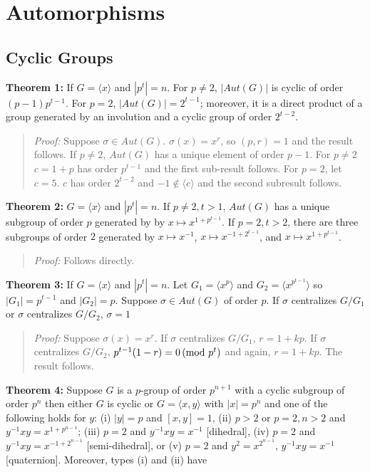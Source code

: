 \chapter{Automorphisms}
\section {Cyclic Groups}
{\bf Theorem 1:}
If $G= \langle x \rangle $ and $|p^t|=n$.  For $p \ne 2$, $|Aut(G)|$ is cyclic of order $(p-1)p^{t-1}$.
For $p=2$, $|Aut(G)|= 2^{t-1}$;
moreover, it is a direct product of a group generated by an  involution and a cyclic group of order $2^{t-2}$.
\begin{quote}
\emph{Proof:} Suppose $\sigma \in Aut(G)$.  $\sigma(x)= x^r$, so $(p,r)=1$ and the result follows.
If $p \ne 2$, $Aut(G)$ has a unique element of order $p-1$. For $p \ne 2$ $c= 1+p$
has order $p^{t-1}$ and the first sub-result follows.  For $p=2$, let $c=5$.  $c$ has order $2^{t-2}$ and
$-1 \notin \langle c \rangle$ and the second subresult follows.
\end{quote}
{\bf Theorem 2:} $G= \langle x \rangle $ and $|p^t|=n$.  If $p \ne 2, t>1$, $Aut(G)$ has a unique subgroup of order
$p$ generated by by $x \mapsto x^{1+p^{t-1}}$.  If $p=2, t > 2$, there are three subgroups of order $2$ generated by
$x \mapsto x^{-1}$,
$x \mapsto x^{-1 + 2^{t-1}}$, and
$x \mapsto x^{1 + p^{t-1}}$.
\begin{quote}
\emph{Proof:} Follows directly.
\end{quote}
{\bf Theorem 3:} If $G= \langle x \rangle $ and $|p^t|=n$. Let 
$G_1 = \langle x^{p} \rangle$ and
$G_2 = \langle x^{p^{t-1}} \rangle$ so $|G_1| = p^{t-1}$ and $|G_2|=p$. Suppose $\sigma \in Aut(G)$
of order $p$.
If $\sigma$ centralizes $G/G_1$ or $\sigma$ centralizes $G/G_2$, $\sigma = 1$
\begin{quote}
\emph{Proof:}  Suppose $\sigma(x) = x^r$.
If $\sigma$ centralizes $G/G_1$, $r=1+kp$.
If $\sigma$ centralizes $G/G_2$, $p^{t-1}(1-r) = 0 \thinspace \textnormal{(mod } p^t \textnormal{)}$ and again, $r=1+kp$.  The result follows.
\end{quote}
{\bf Theorem 4:} Suppose $G$ is a $p$-group of order $p^{n+1}$ with a cyclic subgroup of order $p^n$ then either
$G$ is cyclic or $G= \langle x, y \rangle$ with $|x|=p^n$ and one of the following holds for $y$:
(i) $|y| = p$ and $[x,y]=1$,
(ii) $p > 2$ or $p=2, n>2$ and $y^{-1}x y = x^{1+p^{n-1}}$;
(iii) $p=2$ and $y^{-1}x y = x^{-1}$ [dihedral],
(iv) $p=2$ and $y^{-1}x y = x^{-1 + 2^{n-1}}$ [semi-dihedral], or
(v) $p=2$ and $y^2= x^{2^{n-1}}$, $y^{-1} x y = x^{-1}$ [quaternion].  Moreover, types (i) and (ii) have
